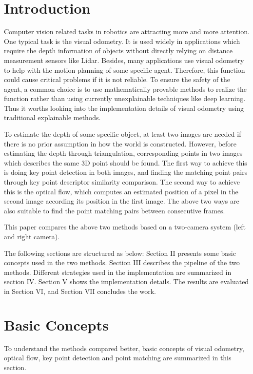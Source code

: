 \documentclass{easychair}
\begin{document}
\section{Introduction}
Computer vision related tasks in robotics are attracting more and more attention. One typical task is the visual odometry. It is used widely in applications which require the depth information of objects without directly relying on distance measurement sensors like Lidar. Besides, many applications use visual odometry to help with the motion planning of some specific agent. Therefore, this function could cause critical problems if it is not reliable. To ensure the safety of the agent, a common choice is to use mathematically provable methods to realize the function rather than using currently unexplainable techniques like deep learning. Thus it worths looking into the implementation details of visual odometry using traditional explainable methods.

To estimate the depth of some specific object, at least two images are needed if there is no prior assumption in how the world is constructed. However, before estimating the depth through triangulation, corresponding points in two images which describes the same 3D point should be found. The first way to achieve this is doing key point detection in both images, and finding the matching point pairs through key point descriptor similarity comparison. The second way to achieve this is the optical flow, which computes an estimated position of a pixel in the second image according its position in the first image. The above two ways are also suitable to find the point matching pairs between consecutive frames. 

This paper compares the above two methods based on a two-camera system (left and right camera).

The following sections are structured as below: Section II presents some basic concepts used in the two methods. Section III describes the pipeline of the two methods. Different strategies used in the implementation are summarized in section IV. Section V shows the implementation details. The results are evaluated in Section VI, and Section VII concludes the work.


\section{Basic Concepts}
To understand the methods compared better, basic concepts of visual odometry, optical flow, key point detection and point matching are summarized in this section.
\end{document}
